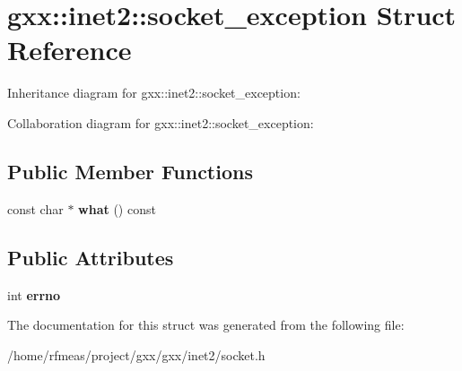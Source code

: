 \hypertarget{structgxx_1_1inet2_1_1socket__exception}{}\section{gxx\+:\+:inet2\+:\+:socket\+\_\+exception Struct Reference}
\label{structgxx_1_1inet2_1_1socket__exception}


Inheritance diagram for gxx\+:\+:inet2\+:\+:socket\+\_\+exception\+:


Collaboration diagram for gxx\+:\+:inet2\+:\+:socket\+\_\+exception\+:
\subsection*{Public Member Functions}
\begin{DoxyCompactItemize}
\item 
const char $\ast$ {\bfseries what} () const \hypertarget{structgxx_1_1inet2_1_1socket__exception_abad33452f673f3e0e4354c539114b5d2}{}\label{structgxx_1_1inet2_1_1socket__exception_abad33452f673f3e0e4354c539114b5d2}

\end{DoxyCompactItemize}
\subsection*{Public Attributes}
\begin{DoxyCompactItemize}
\item 
int {\bfseries errno}\hypertarget{structgxx_1_1inet2_1_1socket__exception_a9d2060c2d325309f663673736732cced}{}\label{structgxx_1_1inet2_1_1socket__exception_a9d2060c2d325309f663673736732cced}

\end{DoxyCompactItemize}


The documentation for this struct was generated from the following file\+:\begin{DoxyCompactItemize}
\item 
/home/rfmeas/project/gxx/gxx/inet2/socket.\+h\end{DoxyCompactItemize}
